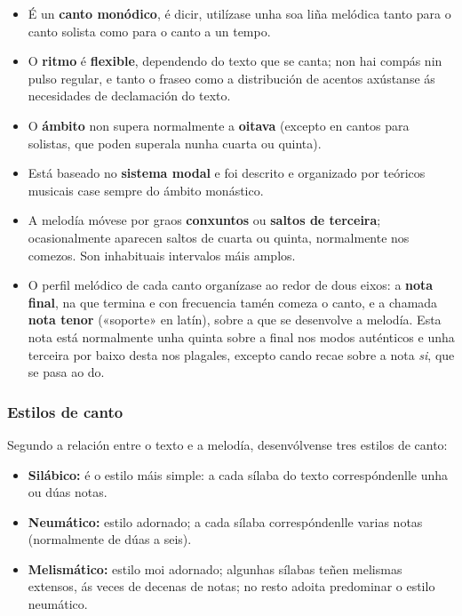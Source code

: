 \documentclass[a4paper, twoside]{templates/ociamthesis}
\providecommand{\tightlist}{%
  \setlength{\itemsep}{0pt}\setlength{\parskip}{0pt}}
\begin{document}
\begin{itemize}
\tightlist
\item
  É un \textbf{canto monódico}, é dicir, utilízase unha soa liña melódica tanto para o canto solista como para o canto a un tempo.
\item
  O \textbf{ritmo} é \textbf{flexible}, dependendo do texto que se canta; non hai compás nin pulso regular, e tanto o fraseo como a distribución de acentos axústanse ás necesidades de declamación do texto.
\item
  O \textbf{ámbito} non supera normalmente a \textbf{oitava} (excepto en cantos para solistas, que poden superala nunha cuarta ou quinta).
\item
  Está baseado no \textbf{sistema modal} e foi descrito e organizado por teóricos musicais case sempre do ámbito monástico.
\item
  A melodía móvese por graos \textbf{conxuntos} ou \textbf{saltos de terceira}; ocasionalmente aparecen saltos de cuarta ou quinta, normalmente nos comezos. Son inhabituais intervalos máis amplos.
\item
  O perfil melódico de cada canto organízase ao redor de dous eixos: a \textbf{nota final}, na que termina e con frecuencia tamén comeza o canto, e a chamada \textbf{nota tenor} («soporte» en latín), sobre a que se desenvolve a melodía. Esta nota está normalmente unha quinta sobre a final nos modos auténticos e unha terceira por baixo desta nos plagales, excepto cando recae sobre a nota \emph{si}, que se pasa ao do.
\end{itemize}

\hypertarget{estilos-de-canto}{%
\subsubsection{Estilos de canto}\label{estilos-de-canto}}

Segundo a relación entre o texto e a melodía, desenvólvense tres estilos de canto:

\begin{itemize}
\tightlist
\item
  \textbf{Silábico:} é o estilo máis simple: a cada sílaba do texto correspóndenlle unha ou dúas notas.
\item
  \textbf{Neumático:} estilo adornado; a cada sílaba correspóndenlle varias notas (normalmente de dúas a seis).
\item
  \textbf{Melismático:} estilo moi adornado; algunhas sílabas teñen melismas extensos, ás veces de decenas de notas; no resto adoita predominar o estilo neumático.
\end{itemize}
\end{document}
